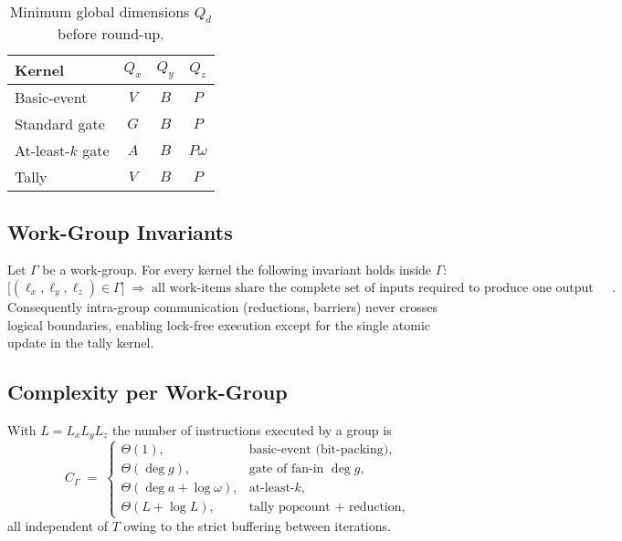 \begin{table}[t]
  \centering
  \caption{Minimum global dimensions $Q_d$ before round-up.}
  \label{tab:kernel_dimensions}
  \begin{tabular}{lccc}
    \toprule
    Kernel               & $Q_x$              & $Q_y$ & $Q_z$\\
    \midrule
    Basic-event          & $V$                & $B$   & $P$\\
    Standard gate        & $G$                & $B$   & $P$\\
    At-least-$k$ gate    & $A$                & $B$   & $P\omega$\\
    Tally                & $V$                & $B$   & $P$\\
    \bottomrule
  \end{tabular}
\end{table}

\subsection{Work-Group Invariants}

Let $\Gamma$ be a work-group.  For every kernel the following invariant holds inside $\Gamma$:
\[
   \bigl[(\ell_x,\ell_y,\ell_z)\in\Gamma\bigr]
   \;\Longrightarrow\;
   \text{all work-items share the complete set of inputs required to produce one output literal}.
\]
Consequently intra-group communication (reductions, barriers) never crosses logical boundaries, enabling lock-free execution except for the single atomic update in the tally kernel.

\subsection{Complexity per Work-Group}

With $L=L_xL_yL_z$ the number of instructions executed by a group is
\[
  C_{\Gamma}
  \;=\;
  \begin{cases}
    \Theta(1), & \text{basic-event (bit-packing)},\\
    \Theta(\deg g), & \text{gate of fan-in }\deg g,\\
    \Theta(\deg a + \log \omega), & \text{at-least-}k,\\
    \Theta(L + \log L), & \text{tally popcount + reduction},
  \end{cases}
\]
all independent of $T$ owing to the strict buffering between iterations.

